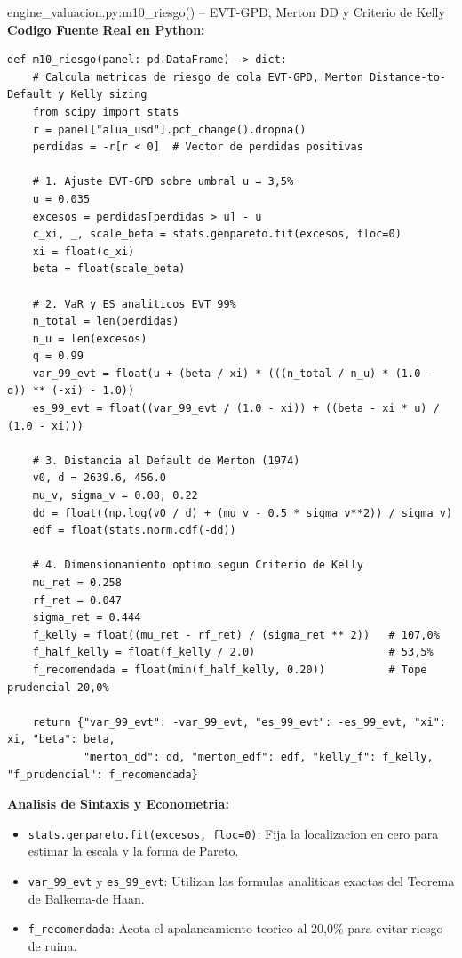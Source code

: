 \documentclass[10pt,a4paper]{article}
\theoremstyle{definition}
\begin{document}
\begin{codebox}{{engine\_valuacion.py:m10\_riesgo() -- EVT-GPD, Merton DD y Criterio de Kelly}}
\textbf{Codigo Fuente Real en Python:}
\begin{verbatim}
def m10_riesgo(panel: pd.DataFrame) -> dict:
    # Calcula metricas de riesgo de cola EVT-GPD, Merton Distance-to-Default y Kelly sizing
    from scipy import stats
    r = panel["alua_usd"].pct_change().dropna()
    perdidas = -r[r < 0]  # Vector de perdidas positivas
    
    # 1. Ajuste EVT-GPD sobre umbral u = 3,5%
    u = 0.035
    excesos = perdidas[perdidas > u] - u
    c_xi, _, scale_beta = stats.genpareto.fit(excesos, floc=0)
    xi = float(c_xi)
    beta = float(scale_beta)
    
    # 2. VaR y ES analiticos EVT 99%
    n_total = len(perdidas)
    n_u = len(excesos)
    q = 0.99
    var_99_evt = float(u + (beta / xi) * (((n_total / n_u) * (1.0 - q)) ** (-xi) - 1.0))
    es_99_evt = float((var_99_evt / (1.0 - xi)) + ((beta - xi * u) / (1.0 - xi)))
    
    # 3. Distancia al Default de Merton (1974)
    v0, d = 2639.6, 456.0
    mu_v, sigma_v = 0.08, 0.22
    dd = float((np.log(v0 / d) + (mu_v - 0.5 * sigma_v**2)) / sigma_v)
    edf = float(stats.norm.cdf(-dd))
    
    # 4. Dimensionamiento optimo segun Criterio de Kelly
    mu_ret = 0.258
    rf_ret = 0.047
    sigma_ret = 0.444
    f_kelly = float((mu_ret - rf_ret) / (sigma_ret ** 2))   # 107,0%
    f_half_kelly = float(f_kelly / 2.0)                     # 53,5%
    f_recomendada = float(min(f_half_kelly, 0.20))          # Tope prudencial 20,0%
    
    return {"var_99_evt": -var_99_evt, "es_99_evt": -es_99_evt, "xi": xi, "beta": beta,
            "merton_dd": dd, "merton_edf": edf, "kelly_f": f_kelly, "f_prudencial": f_recomendada}
\end{verbatim}
\textbf{Analisis de Sintaxis y Econometria:}
\begin{itemize}
    \item \texttt{stats.genpareto.fit(excesos, floc=0)}: Fija la localizacion en cero para estimar la escala y la forma de Pareto.
    \item \texttt{var\_99\_evt} y \texttt{es\_99\_evt}: Utilizan las formulas analiticas exactas del Teorema de Balkema-de Haan.
    \item \texttt{f\_recomendada}: Acota el apalancamiento teorico al 20,0\% para evitar riesgo de ruina.
\end{itemize}
\end{codebox}
\clearpage
\end{document}
